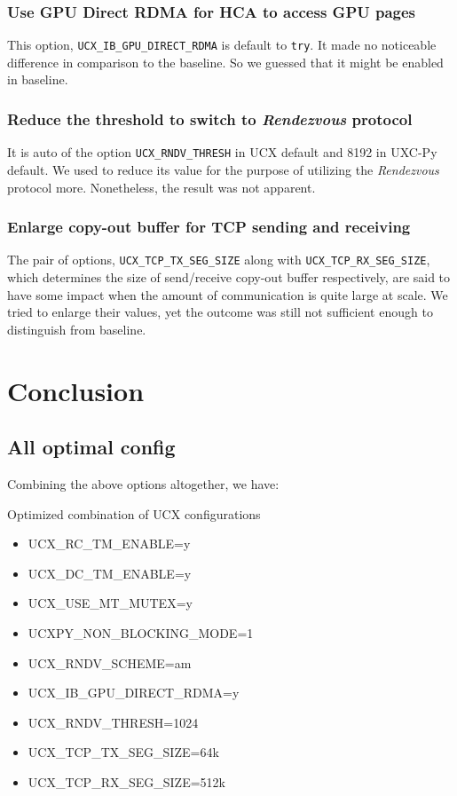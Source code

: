 \documentclass{article}
\begin{document}
\subsubsection{Use GPU Direct RDMA for HCA to access GPU pages}

This option, \texttt{UCX\_IB\_GPU\_DIRECT\_RDMA} is default to \texttt{try}. It made no noticeable difference in comparison to the baseline. So we guessed that it might be enabled in baseline.

\subsubsection{Reduce the threshold to switch to \textit{Rendezvous} protocol}

It is auto of the option \texttt{UCX\_RNDV\_THRESH} in \textsf{UCX} default and 8192 in \textsf{UXC-Py} default. We used to reduce its value for the purpose of utilizing the \textit{Rendezvous} protocol more. Nonetheless, the result was not apparent.

\subsubsection{Enlarge copy-out buffer for TCP sending and receiving}

The pair of options, \texttt{UCX\_TCP\_TX\_SEG\_SIZE} along with \texttt{UCX\_TCP\_RX\_SEG\_SIZE}, which determines the size of send/receive copy-out buffer respectively, are said to have some impact when the amount of communication is quite large at scale. We tried to enlarge their values, yet the outcome was still not sufficient enough to distinguish from baseline.

\section{Conclusion}

\subsection{All optimal config}

Combining the above options altogether, we have:

\begin{table}[htbp]
    \caption{Optimized combination of \textsf{UCX} configurations}
    \label{tab:opt config}
    \begin{itemize}
        \ttfamily
    	\item UCX\_RC\_TM\_ENABLE=y
        \item UCX\_DC\_TM\_ENABLE=y
        \item UCX\_USE\_MT\_MUTEX=y
        \item UCXPY\_NON\_BLOCKING\_MODE=1
        \item UCX\_RNDV\_SCHEME=am
        \item UCX\_IB\_GPU\_DIRECT\_RDMA=y
        \item UCX\_RNDV\_THRESH=1024
        \item UCX\_TCP\_TX\_SEG\_SIZE=64k
        \item UCX\_TCP\_RX\_SEG\_SIZE=512k
    \end{itemize}
\end{table}
\end{document}
